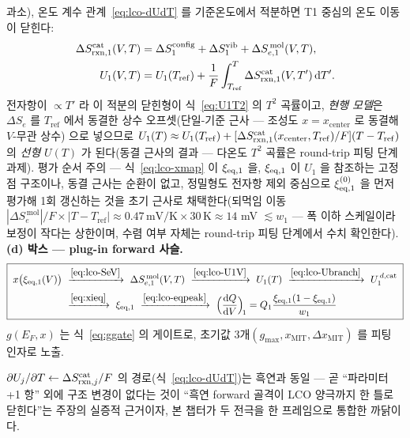 \begin{enumerate}[label=(\roman*),leftmargin=2.2em,itemsep=1pt]
과소), 온도 계수 관계~\eqref{eq:lco-dUdT} 를 기준온도에서 적분하면 T1 중심의 온도 이동이 닫힌다:
\begin{equation}
\begin{aligned}
\Delta S_{\mathrm{rxn},1}^\mathrm{cat}(V,T)&=\Delta S_1^\mathrm{config}+\Delta S_1^\mathrm{vib}
+\Delta S_{e,1}^{\,\mathrm{mol}}(V,T),\\
U_1(V,T)&=U_1(T_\mathrm{ref})+\frac1F\int_{T_\mathrm{ref}}^{T}\Delta S_{\mathrm{rxn},1}^\mathrm{cat}(V,T')\,\mathrm{d} T'.
\end{aligned}
\label{eq:lco-U1V}
\end{equation}
전자항이 $\propto T'$ 라 이 적분의 닫힌형이 식~\eqref{eq:U1T2} 의 $T^2$ 곡률이고, \emph{현행 모델}은
$\Delta S_e$ 를 $T_\mathrm{ref}$ 에서 동결한 상수 오프셋(단일-기준 근사 --- 조성도 $x{=}x_\mathrm{center}$ 로
동결해 $V$-무관 상수)
으로 넣으므로 $U_1(T)\approx U_1(T_\mathrm{ref})+[\Delta S_{\mathrm{rxn},1}^\mathrm{cat}(x_\mathrm{center},T_\mathrm{ref})/F]
(T-T_\mathrm{ref})$ 의 \emph{선형} $U(T)$ 가 된다(동결 근사의 결과 --- 다온도 $T^2$ 곡률은 round-trip 피팅 단계 과제). 평가 순서 주의 --- 식~\eqref{eq:lco-xmap} 이
$\xi_{\mathrm{eq},1}$ 을, $\xi_{\mathrm{eq},1}$ 이 $U_1$ 을 참조하는 고정점 구조이나, 동결 근사는 순환이 없고, 정밀형도
전자항 제외 중심으로 $\xi_{\mathrm{eq},1}^{(0)}$ 을 먼저 평가해 1회 갱신하는 것을 초기 근사로 채택한다(되먹임
이동 $|\Delta S_e^{\,\mathrm{mol}}|/F\times|T-T_\mathrm{ref}|\approx0.47\,\mathrm{mV/K}\times30\,\mathrm K
\approx14$ mV $\lesssim w_1$ --- 폭 이하 스케일이라 보정이 작다는 상한이며, 수렴 여부 자체는 round-trip
피팅 단계에서 수치 확인한다). \textbf{(d) 박스 --- plug-in forward 사슬.}
\begin{equation}
\boxed{\;\begin{aligned}
x\big(\xi_{\eq,1}(V)\big)\ &\xrightarrow{\eqref{eq:lco-SeV}}\ \Delta S_{e,1}^{\,\mathrm{mol}}(V,T)
\ \xrightarrow{\eqref{eq:lco-U1V}}\ U_1(T)\ \xrightarrow{\eqref{eq:lco-Ubranch}}\ U_1^{\,d,\mathrm{cat}}\\[2pt]
&\xrightarrow{\eqref{eq:xieq}}\ \xi_{\eq,1}\ \xrightarrow{\eqref{eq:lco-eqpeak}}\
\Big(\frac{\dd Q}{\dd V}\Big)_{\!1}=Q_1\frac{\xi_{\eq,1}(1-\xi_{\eq,1})}{w_1}
\end{aligned}\;}
\label{eq:lco-plugin}
\end{equation}
$g(E_F,x)$ 는 식~\eqref{eq:ggate} 의 게이트로, 초기값 3개$(g_{\max},x_\mathrm{MIT},\Delta x_\mathrm{MIT})$
를 피팅 인자로 노출.
\end{enumerate}
$\partial U_j/\partial T\leftarrow\Delta S_{\mathrm{rxn},j}^\mathrm{cat}/F$ 의 경로(식~\eqref{eq:lco-dUdT})는 흑연과 동일 ---
곧 ``파라미터 +1 항'' 외에 구조 변경이 없다는 것이 ``흑연 forward 골격이 LCO 양극까지 한 틀로 닫힌다''는
주장의 실증적 근거이자, 본 챕터가 두 전극을 한 프레임으로 통합한 까닭이다.

